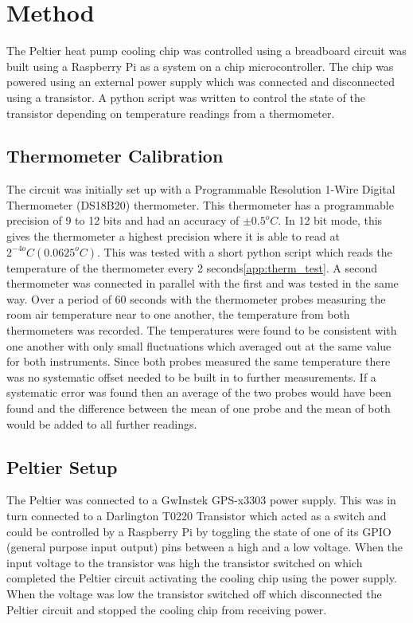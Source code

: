 \documentclass[10pt]{article}
\begin{document}
\section*{Method}
The Peltier heat pump cooling chip was controlled using a breadboard circuit was built using a Raspberry Pi\cite{rpi} as a system on a chip microcontroller. The chip was powered using an external power supply which was connected and disconnected using a transistor. A python script was written to control the state of the transistor depending on temperature readings from a thermometer. \\

\subsection*{Thermometer Calibration}

The circuit was initially set up with a Programmable Resolution 1-Wire Digital Thermometer (DS18B20) thermometer\cite{thermometer}. This thermometer has a programmable precision of 9 to 12 bits and had an accuracy of $\pm 0.5^oC$. In 12 bit mode, this gives the thermometer a highest precision where it is able to read at $2^{-4o} C (0.0625^o C)$. This was tested with a short python script which reads the temperature of the thermometer every 2 seconds\ref{app:therm_test}. A second thermometer was connected in parallel with the first and was tested in the same way. Over a period of 60 seconds with the thermometer probes measuring the room air temperature near to one another, the temperature from both thermometers was recorded. The temperatures were found to be consistent with one another with only small fluctuations which averaged out at the same value for both instruments. Since both probes measured the same temperature there was no systematic offset needed to be built in to further measurements. If a systematic error was found then an average of the two probes would have been found and the difference between the mean of one probe and the mean of both would be added to all further readings.\\

\subsection*{Peltier Setup}
The Peltier was connected to a GwInstek GPS-x3303 power supply\cite{powe_sup}. This was in turn connected to a Darlington T0220 Transistor\cite{trans} which acted as a switch and could be controlled by a Raspberry Pi by toggling the state of one of its GPIO (general purpose input output) pins between a high and a low voltage. When the input voltage to the transistor was high the transistor switched on which completed the Peltier circuit activating the cooling chip using the power supply. When the voltage was low the transistor switched off which disconnected the Peltier circuit and stopped the cooling chip from receiving power.\\
\end{document}
